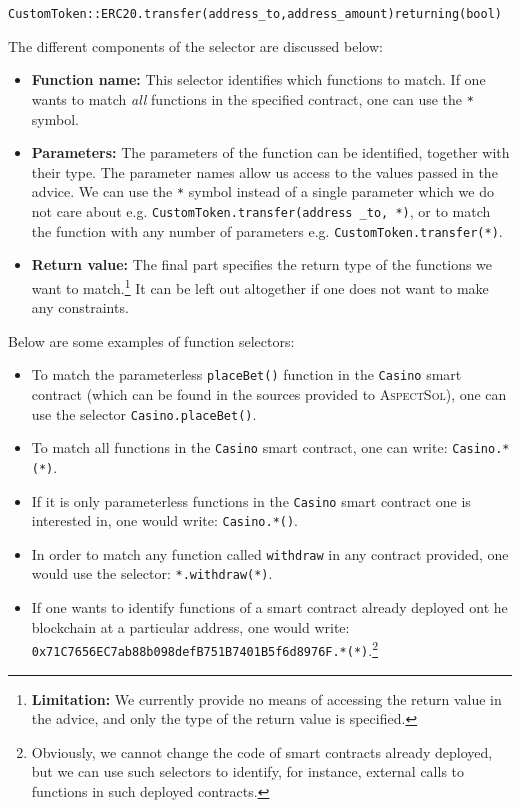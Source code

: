 \documentclass{article}
\newcommand{\AspectSol}{\textsc{AspectSol}\xspace}
\begin{document}
\begin{alltt}
CustomToken::ERC20.transfer(address _to, address _amount) returning (bool)
\end{alltt}

The different components of the selector are discussed below:

\begin{itemize}
    \item \textbf{Function name:} This selector identifies which functions to match. If one wants to match \emph{all} functions in the specified contract, one can use the \texttt{*} symbol.
    \item \textbf{Parameters:} The parameters of the function can be identified, together with their type. The parameter names allow us access to the values passed in the advice. We can use the \texttt{*} symbol instead of a single parameter which we do not care about e.g. \texttt{CustomToken.transfer(address \_to, *)}, or to match the function with any number of parameters e.g. \texttt{CustomToken.transfer(*)}.
    \item \textbf{Return value:} The final part specifies the return type of the functions we want to match.\footnote{\textbf{Limitation:} We currently provide no means of accessing the return value in the advice, and only the type of the return value is specified.}  It can be left out altogether if one does not want to make any constraints. 
\end{itemize}

Below are some examples of function selectors: 

\begin{itemize}
    \item To match the parameterless \texttt{placeBet()} function in the \texttt{Casino} smart contract (which can be found in the sources provided to \AspectSol), one can use the selector \texttt{Casino.placeBet()}.
    \item To match all functions in the \texttt{Casino} smart contract, one can write: \texttt{Casino.*(*)}.
    \item If it is only parameterless functions in the \texttt{Casino} smart contract one is interested in, one would write: \texttt{Casino.*()}.
    \item In order to match any function called \texttt{withdraw} in any contract provided, one would use the selector: \texttt{*.withdraw(*)}.
    \item If one wants to identify functions of a smart contract already deployed ont he blockchain at a particular address, one would write: \texttt{0x71C7656EC7ab88b098defB751B7401B5f6d8976F.*(*)}.\footnote{Obviously, we cannot change the code of smart contracts already deployed, but we can use such selectors to identify, for instance, external calls to functions in such deployed contracts.} 
\end{itemize}
\end{document}
